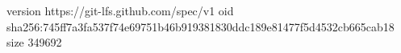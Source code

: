 version https://git-lfs.github.com/spec/v1
oid sha256:745ff7a3fa537f74e69751b46b919381830ddc189e81477f5d4532cb665cab18
size 349692
